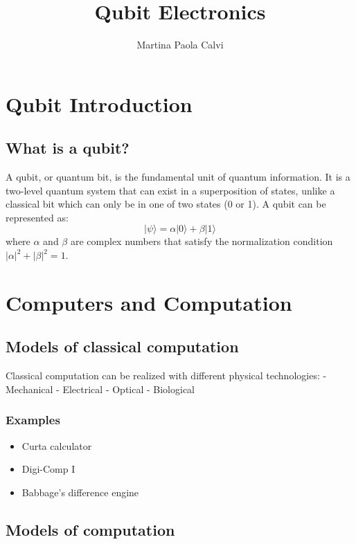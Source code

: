\documentclass[
]{article}
\title{Qubit Electronics}
\author{Martina Paola Calvi}
\providecommand{\tightlist}{%
  \setlength{\itemsep}{0pt}\setlength{\parskip}{0pt}}
\begin{document}
\maketitle
\newpage
{
\setcounter{tocdepth}{3}
\tableofcontents
}
\section{Qubit Introduction}\label{qubit-introduction}

\subsection{What is a qubit?}\label{what-is-a-qubit}

A qubit, or quantum bit, is the fundamental unit of quantum information.
It is a two-level quantum system that can exist in a superposition of
states, unlike a classical bit which can only be in one of two states (0
or 1). A qubit can be represented as:
\[|\psi\rangle = \alpha|0\rangle + \beta|1\rangle
\] where \(\alpha\) and \(\beta\) are complex numbers that satisfy the
normalization condition \(|\alpha|^2 + |\beta|^2 = 1\).

\section{Computers and Computation}\label{computers-and-computation}

\subsection{Models of classical
computation}\label{models-of-classical-computation}

Classical computation can be realized with different physical
technologies: - Mechanical - Electrical - Optical - Biological

\subsubsection{Examples}\label{examples}

\begin{itemize}
\tightlist
\item
  Curta calculator
\item
  Digi-Comp I
\item
  Babbage's difference engine
\end{itemize}

\subsection{Models of computation}\label{models-of-computation}
\end{document}
